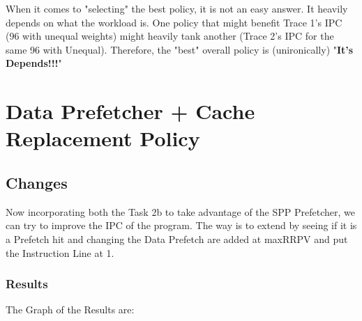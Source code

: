 \documentclass[11pt,a4paper]{article}
\begin{document}
When it comes to "selecting" the best policy, it is not an easy answer. It heavily depends on what the workload is. One policy that might benefit Trace 1's IPC (96 with unequal weights) might heavily tank another (Trace 2's IPC for the same 96 with Unequal). Therefore, the "best" overall policy is (unironically) "\textbf{It's Depends!!!}"


\section{Data Prefetcher + Cache Replacement Policy}
\subsection{Changes}
Now incorporating both the Task 2b to take advantage of the SPP Prefetcher, we can try to improve the IPC of the program. The way is to extend by seeing if it is a Prefetch hit and changing the Data Prefetch are added at maxRRPV and put the Instruction Line at 1.

\subsubsection{Results}

The Graph of the Results are:

\end{document}
